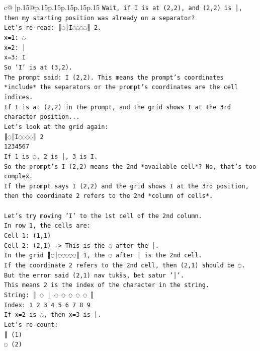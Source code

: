 \documentclass{article}
\begin{document}
{\begin{supertabular}{c@{$\;$}|p{.15\linewidth}@{}p{.15\linewidth}p{.15\linewidth}p{.15\linewidth}p{.15\linewidth}p{.15\linewidth}}
{{{\texttt{Wait, if I is at (2,2), and (2,2) is │, then my starting position was already on a separator?} \\
\texttt{Let's re{-}read: ║◌│I◌◌◌◌║ 2.} \\
\texttt{x=1: ◌} \\
\texttt{x=2: │} \\
\texttt{x=3: I} \\
\texttt{So 'I' is at (3,2).} \\
\texttt{The prompt said: I (2,2). This means the prompt's coordinates *include* the separators or the prompt's coordinates are the cell indices.} \\
\texttt{If I is at (2,2) in the prompt, and the grid shows I at the 3rd character position...} \\
\texttt{Let's look at the grid again:} \\
\texttt{║◌│I◌◌◌◌║ 2} \\
\texttt{1234567} \\
\texttt{If 1 is ◌, 2 is │, 3 is I.} \\
\texttt{So the prompt's I (2,2) means the 2nd *available cell*? No, that's too complex.} \\
\texttt{If the prompt says I (2,2) and the grid shows I at the 3rd position, then the coordinate 2 refers to the 2nd *column of cells*.} \\
\\ 
\texttt{Let's try moving 'I' to the 1st cell of the 2nd column.} \\
\texttt{In row 1, the cells are:} \\
\texttt{Cell 1: (1,1)} \\
\texttt{Cell 2: (2,1) {-}> This is the ◌ after the │.} \\
\texttt{In the grid ║◌│◌◌◌◌◌║ 1, the ◌ after │ is the 2nd cell.} \\
\texttt{If the coordinate 2 refers to the 2nd cell, then (2,1) should be ◌.} \\
\texttt{But the error said (2,1) nav tukšs, bet satur '│'.} \\
\texttt{This means 2 is the index of the character in the string.} \\
\texttt{String: ║ ◌ │ ◌ ◌ ◌ ◌ ◌ ║} \\
\texttt{Index: 1 2 3 4 5 6 7 8 9} \\
\texttt{If x=2 is ◌, then x=3 is │.} \\
\texttt{Let's re{-}count:} \\
\texttt{║ (1)} \\
\texttt{◌ (2)} \\
}}}
\end{supertabular}}
\end{document}
